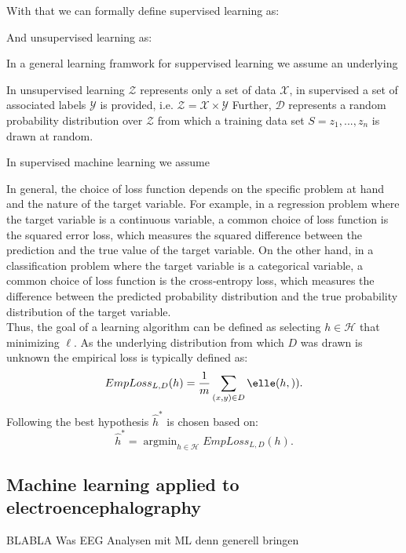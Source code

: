 With that we can formally define supervised learning as: 

And unsupervised learning as: 


In a general learning framwork for suppervised learning we assume an underlying 

In unsupervised learning $\mathcal{Z}$ represents only a set of data $\mathcal{X}$, in supervised a set of associated labels $\mathcal{Y}$ is provided, i.e. $\mathcal{Z}=\mathcal{X}\times\mathcal{Y}$
Further, $\mathcal{D}$ represents a random probability distribution over $\mathcal{Z}$ from which a training data set $S={z_1,...,z_n}$ is drawn at random.

In supervised machine learning we assume 

In general, the choice of loss function depends on the specific problem at hand and the nature of the target variable. For example, in a regression problem where the target variable is a continuous variable, a common choice of loss function is the squared error loss, which measures the squared difference between the prediction and the true value of the target variable. On the other hand, in a classification problem where the target variable is a categorical variable, a common choice of loss function is the cross-entropy loss, which measures the difference between the predicted probability distribution and the true probability distribution of the target variable.\\




Thus, the goal of a learning algorithm can be defined as selecting $h \in \mathcal{H}$ that minimizing $\ell$. As the underlying distribution from which $D$ was drawn is unknown the empirical loss is typically defined as: 
\begin{equation}
EmpLoss_{L,D}(h)=\frac{1}{m}\sum_{(x,y)\in{D}}\elle(h,)).
\end{equation}
Following the best hypothesis $\hat{h}^*$ is chosen based on: 
\begin{equation}
\hat{h}^*=\operatorname{argmin}_{h\in{\mathcal{H}}}EmpLoss_{L,D}(h) .
\end{equation}



\subsection{Machine learning applied to electroencephalography}
BLABLA Was EEG Analysen mit ML denn generell bringen 

